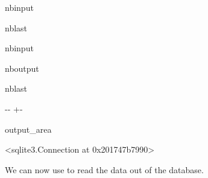\documentclass[letterpaper,10pt,english]{sphinxmanual}
\newlength\nbsphinxcodecellspacing
\begin{document}
\begin{sphinxuseclass}{nbinput}
\begin{sphinxuseclass}{nblast}
{
\begin{sphinxVerbatim}[commandchars=\\\{\}]
\llap{\color{nbsphinxin}[2]:\,\hspace{\fboxrule}\hspace{\fboxsep}}  
\end{sphinxVerbatim}
}

\end{sphinxuseclass}
\end{sphinxuseclass}
\begin{sphinxuseclass}{nbinput}
{
\begin{sphinxVerbatim}[commandchars=\\\{\}]
\llap{\color{nbsphinxin}[3]:\,\hspace{\fboxrule}\hspace{\fboxsep}}
\end{sphinxVerbatim}
}

\end{sphinxuseclass}
\begin{sphinxuseclass}{nboutput}
\begin{sphinxuseclass}{nblast}
{

\kern-\sphinxverbatimsmallskipamount\kern-\baselineskip
\kern+\FrameHeightAdjust\kern-\fboxrule
\vspace{\nbsphinxcodecellspacing}

\begin{sphinxuseclass}{output_area}
\begin{sphinxuseclass}{}


\begin{sphinxVerbatim}[commandchars=\\\{\}]
\llap{\color{nbsphinxout}[3]:\,\hspace{\fboxrule}\hspace{\fboxsep}}<sqlite3.Connection at 0x201747b7990>
\end{sphinxVerbatim}



\end{sphinxuseclass}
\end{sphinxuseclass}
}

\end{sphinxuseclass}
\end{sphinxuseclass}
\sphinxAtStartPar
We can now use  to read the data out of the database.
\end{document}
